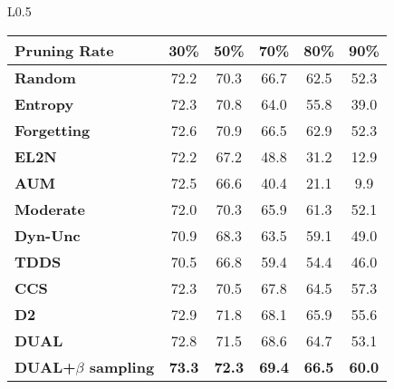 \begin{wrapfigure}[20]{L}{0.5\textwidth}
\vspace{2mm}
    \centering
    \small
    \setlength{\tabcolsep}{3pt}
    \begin{tabular}{lccccc}
        \toprule
        \textbf{Pruning Rate} & \textbf{30\%} & \textbf{50\%} & \textbf{70\%} & \textbf{80\%} & \textbf{90\%} \\
        \midrule
        \textbf{Random} & 72.2 & 70.3 & 66.7 & 62.5 & 52.3 \\
        \textbf{Entropy} & 72.3 & 70.8 & 64.0 & 55.8 & 39.0 \\
        \textbf{Forgetting} & 72.6 & 70.9 & 66.5 & 62.9 & 52.3 \\
        \textbf{EL2N} & 72.2 & 67.2 & 48.8 & 31.2 & 12.9 \\
        \textbf{AUM} & 72.5 & 66.6 & 40.4 & 21.1 & 9.9 \\
        \textbf{Moderate} & 72.0 & 70.3 & 65.9 & 61.3 & 52.1 \\
        \textbf{Dyn-Unc} & 70.9 & 68.3 & 63.5 & 59.1 & 49.0 \\
        \textbf{TDDS} & 70.5 & 66.8 & 59.4 & 54.4 & 46.0 \\
        \textbf{CCS} & 72.3 & 70.5 & 67.8 & 64.5 & 57.3 \\
        \textbf{D2} & 72.9 & 71.8 & 68.1 & 65.9 & 55.6 \\
        \midrule
        \textbf{DUAL} & 72.8 & 71.5 & 68.6 & 64.7 & 53.1 \\
        \textbf{DUAL+$\beta$ sampling} & \textbf{73.3} & \textbf{72.3} & \textbf{69.4} & \textbf{66.5} & \textbf{60.0} \\
        \bottomrule
    \end{tabular}
\end{wrapfigure}